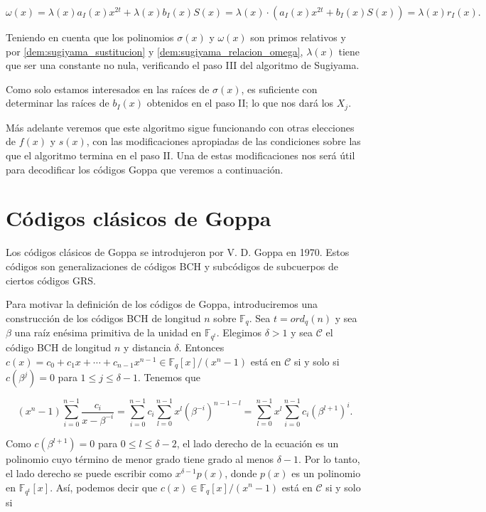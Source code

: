 \begin{equation}
    \label{dem:sugiyama_relacion_omega}
    \omega(x) = \lambda(x) a_I(x) x^{2t} + \lambda(x) b_I(x) S(x) = \lambda(x) \cdot \left( a_I(x) x^{2t} + b_I(x) S(x) \right) = \lambda(x) r_I(x).
\end{equation}

Teniendo en cuenta que los polinomios $\sigma(x)$ y $\omega(x)$ son primos relativos y por \ref{dem:sugiyama_sustitucion} y \ref{dem:sugiyama_relacion_omega}, $\lambda(x)$ tiene que ser una constante no nula, verificando el paso III del algoritmo de Sugiyama.

Como solo estamos interesados en las raíces de $\sigma(x)$, es suficiente con determinar las raíces de $b_I(x)$ obtenidos en el paso II; lo que nos dará los $X_j$. 

Más adelante veremos que este algoritmo sigue funcionando con otras elecciones de $f(x)$ y $s(x)$, con las modificaciones apropiadas de las condiciones sobre las que el algoritmo termina en el paso II. Una de estas modificaciones nos será útil para decodificar los códigos Goppa que veremos a continuación.

\section{Códigos clásicos de Goppa}

Los códigos clásicos de Goppa se introdujeron por V. D. Goppa en 1970. Estos códigos son generalizaciones de códigos BCH y subcódigos de subcuerpos de ciertos códigos GRS.

Para motivar la definición de los códigos de Goppa, introduciremos una construcción de los códigos BCH de longitud $n$ sobre $\mathbb{F}_q$. Sea $t = ord_q(n)$ y sea $\beta$ una raíz enésima primitiva de la unidad en $\mathbb{F}_{q^t}$. Elegimos $\delta > 1$ y sea $\mathcal{C}$ el código BCH de longitud $n$ y distancia $\delta$. Entonces $c(x) = c_0 + c_1x + \cdots + c_{n-1}x^{n-1} \in \mathbb{F}_q [x] / (x^n - 1)$ está en $\mathcal{C}$ si y solo si $c(\beta^j) = 0$ para $1 \leq j \leq \delta - 1$. Tenemos que 

$$(x^n - 1) \sum_{i=0}^{n-1} \frac{c_i}{x - \beta ^{-i}} = \sum_{i=0}^{n-1} c_i \sum_{l=0}^{n-1} x^l \left( \beta ^{-i} \right) ^{n-1-l} = \sum_{l=0}^{n-1} x^l \sum_{i=0}^{n-1} c_i \left( \beta^{l+1} \right) ^i.$$

Como $c(\beta^{l+1}) = 0$ para $0 \leq l \leq \delta - 2$, el lado derecho de la ecuación es un polinomio cuyo término de menor grado tiene grado al menos $\delta - 1$. Por lo tanto, el lado derecho se puede escribir como $x^{\delta - 1} p(x)$, donde $p(x)$ es un polinomio en $\mathbb{F}_{q^t}[x]$. Así, podemos decir que $c(x) \in \mathbb{F}_q[x] / (x^n - 1)$ está en $\mathcal{C}$ si y solo si 

